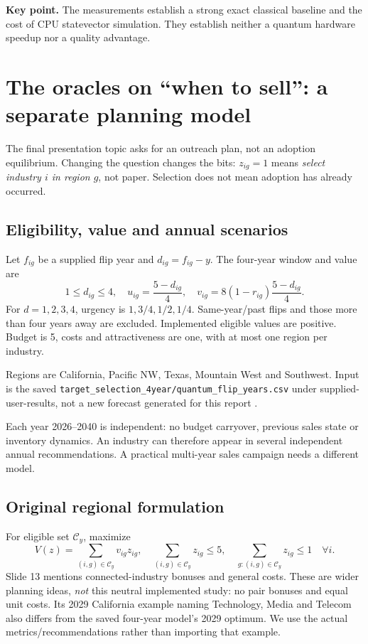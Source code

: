 \documentclass[11pt,letterpaper]{article}
\newcommand{\page}{\clearpage}
\newcommand{\takeaway}[1]{\par\smallskip\textbf{Key point.} #1\par}
\newcommand{\file}[1]{\nolinkurl{#1}}
\begin{document}
\takeaway{The measurements establish a strong exact classical baseline and the cost of CPU statevector simulation. They establish neither a quantum hardware speedup nor a quality advantage.}
\page
\section{The oracles on ``when to sell'': a separate planning model}\label{sec:targetmodel}
The final presentation topic asks for an outreach plan, not an adoption equilibrium. Changing the question changes the bits: $z_{ig}=1$ means \emph{select industry $i$ in region $g$}, not paper. Selection does not mean adoption has already occurred.

\subsection{Eligibility, value and annual scenarios}
Let $f_{ig}$ be a supplied flip year and $d_{ig}=f_{ig}-y$. The four-year window and value are
\begin{equation}
 1\leq d_{ig}\leq4,\quad u_{ig}=\frac{5-d_{ig}}4,\quad
 v_{ig}=8(1-r_{ig})\frac{5-d_{ig}}4.\label{eq:value}
\end{equation}
For $d=1,2,3,4$, urgency is $1,3/4,1/2,1/4$. Same-year/past flips and those more than four years away are excluded. Implemented eligible values are positive. Budget is 5, costs and attractiveness are one, with at most one region per industry.

Regions are California, Pacific NW, Texas, Mountain West and Southwest. Input is the saved \file{target_selection_4year/quantum_flip_years.csv} under supplied-user-results, not a new forecast generated for this report \cite{target}.

Each year 2026--2040 is independent: no budget carryover, previous sales state or inventory dynamics. An industry can therefore appear in several independent annual recommendations. A practical multi-year sales campaign needs a different model.

\subsection{Original regional formulation}
For eligible set $\mathcal C_y$, maximize
\begin{equation}
 V(z)=\sum_{(i,g)\in\mathcal C_y}v_{ig}z_{ig},\quad
 \sum_{(i,g)\in\mathcal C_y}z_{ig}\leq5,\quad
 \sum_{g:(i,g)\in\mathcal C_y}z_{ig}\leq1\quad\forall i.
\end{equation}
Slide 13 mentions connected-industry bonuses and general costs. These are wider planning ideas, \emph{not} this neutral implemented study: no pair bonuses and equal unit costs. Its 2029 California example naming Technology, Media and Telecom also differs from the saved four-year model's 2029 optimum. We use the actual metrics/recommendations rather than importing that example.
\end{document}
